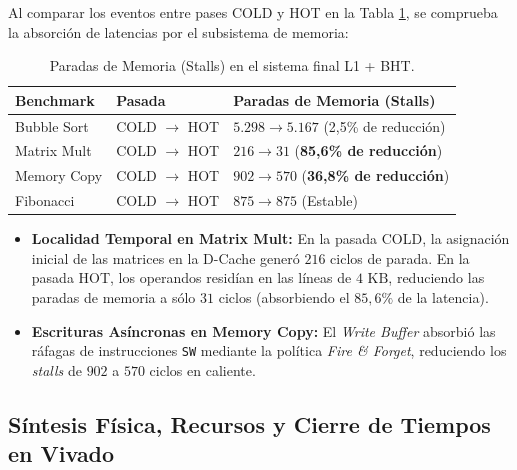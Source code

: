 \documentclass[10pt,a4paper]{article}
\begin{document}
Al comparar los eventos entre pases COLD y HOT en la Tabla \ref{tab:pipeline_events}, se comprueba la absorción de latencias por el
subsistema de memoria:

\begin{table}[H]
    \centering
    \small
    \caption{Paradas de Memoria (Stalls) en el sistema final L1 + BHT.}
    \label{tab:pipeline_events}
    \begin{tabularx}{0.88\textwidth}{@{}>{\centering\arraybackslash}p{} >{\centering\arraybackslash}p{} >{\centering\arraybackslash}X@{}}
        \toprule
        \textbf{Benchmark} & \textbf{Pasada} & \textbf{Paradas de Memoria (Stalls)} \\
        \midrule
        Bubble Sort & COLD $\to$ HOT & $5.298 \to 5.167$ (2,5\% de reducción) \\
        Matrix Mult & COLD $\to$ HOT & $216 \to 31$ (\textbf{85,6\% de reducción}) \\
        Memory Copy & COLD $\to$ HOT & $902 \to 570$ (\textbf{36,8\% de reducción}) \\
        Fibonacci   & COLD $\to$ HOT & $875 \to 875$ (Estable) \\
        \bottomrule
    \end{tabularx}
\end{table}

\begin{itemize}
    \item \textbf{Localidad Temporal en Matrix Mult:} En la pasada COLD, la asignación inicial de las matrices en la D-Cache generó $216$ ciclos de parada. En la pasada 
    HOT, los operandos residían en las líneas de $4\text{ KB}$, reduciendo las paradas de memoria a sólo $31$ ciclos (absorbiendo el $85,6\%$ de la latencia).
    \item \textbf{Escrituras Asíncronas en Memory Copy:} El \textit{Write Buffer} absorbió las ráfagas de instrucciones \texttt{SW} mediante la política \textit{Fire \& Forget}, 
    reduciendo los \textit{stalls} de $902$ a $570$ ciclos en caliente.
\end{itemize}

\subsection{Síntesis Física, Recursos y Cierre de Tiempos en Vivado}
\end{document}
